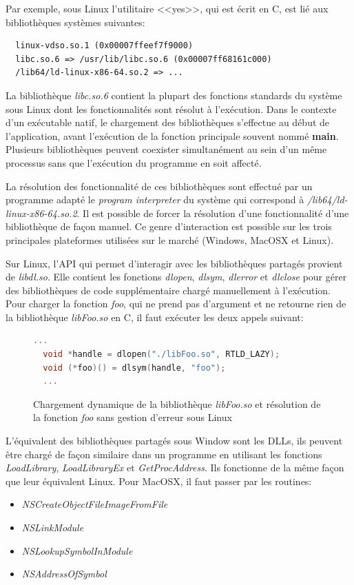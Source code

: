 \documentclass[12pt,initial,twoside,maitrise]{dms}
\numberwithin{equation}{section}
\numberwithin{table}{chapter}
\numberwithin{figure}{chapter}
\begin{document}
Par exemple, sous Linux l'utilitaire <<yes>>, qui est écrit en C,
est lié aux bibliothèques systèmes suivantes:
\begin{verbatim}
  linux-vdso.so.1 (0x00007ffeef7f9000)
  libc.so.6 => /usr/lib/libc.so.6 (0x00007ff68161c000)
  /lib64/ld-linux-x86-64.so.2 => ...
\end{verbatim}
La bibliothèque \textit{libc.so.6} contient la plupart des fonctions
standards du système sous Linux dont les fonctionnalités sont résolut
à l'exécution.
Dans le contexte d'un exécutable natif, le chargement des bibliothèques
s'effectue au début de l'application, avant l'exécution de la fonction principale
souvent nommé \textbf{main}. Plusieurs bibliothèques peuvent coexister simultanément au
sein d'un même processus sans que l'exécution du programme en soit affecté.

La résolution des fonctionnalité de ces bibliothèques sont effectué par un programme adapté
le \textit{program interpreter} du système qui correspond à \textit{/lib64/ld-linux-x86-64.so.2}.
Il est possible de forcer la résolution d'une fonctionnalité d'une bibliothèque
de façon manuel. Ce genre d'interaction est possible sur
les trois principales plateformes utilisées sur le marché (Windows, MacOSX et Linux).

Sur Linux, l'API qui permet d'interagir avec les bibliothèques partagés provient de \textit{libdl.so}.
Elle contient les fonctions \textit{dlopen}, \textit{dlsym}, \textit{dlerror} et \textit{dlclose} pour gérer
des bibliothèques de code supplémentaire chargé manuellement à l'exécution.  Pour charger la fonction
\textit{foo}, qui ne prend pas d'argument et ne retourne rien de la bibliothèque \textit{libFoo.so} en C,
il faut exécuter les deux appels suivant:
\begin{center}
  \begin{figure}[ht]
\begin{lstlisting}[language=C,frame=single]
  ...
  void *handle = dlopen("./libFoo.so", RTLD_LAZY);
  void (*foo)() = dlsym(handle, "foo");
  ...
\end{lstlisting}
\caption{Chargement dynamique de la bibliothèque \textit{libFoo.so} et
résolution de la fonction \textit{foo} sans gestion d'erreur sous Linux}
  \end{figure}
\end{center}
L'équivalent des bibliothèques partagés sous Window sont les DLLs, ils peuvent être chargé de façon similaire dans un
programme en utilisant les fonctions \textit{LoadLibrary}, \textit{LoadLibraryEx} et \textit{GetProcAddress}. Ils
fonctionne de la même façon que leur équivalent Linux. Pour MacOSX, il faut passer par les routines:
\begin{itemize}
    \item \textit{NSCreateObjectFileImageFromFile}
    \item \textit{NSLinkModule}
    \item \textit{NSLookupSymbolInModule}
    \item \textit{NSAddressOfSymbol}
\end{itemize}
\end{document}
